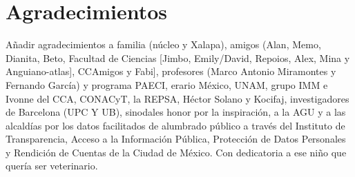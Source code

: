 \chapter{Agradecimientos}


Añadir agradecimientos a familia (núcleo y Xalapa), amigos (Alan, Memo, Dianita, Beto, Facultad de Ciencias [Jimbo, Emily/David, Repoios, Alex, Mina y Anguiano-atlas], CCAmigos y Fabi], profesores (Marco Antonio Miramontes y Fernando García) y programa PAECI, erario México, UNAM, grupo IMM e Ivonne del CCA, CONACyT, la REPSA, Héctor Solano y Kocifaj, investigadores de Barcelona (UPC Y UB), sinodales honor por la inspiración,  a la AGU y a las alcaldías por los datos facilitados de alumbrado público a través del Instituto de Transparencia, Acceso a la Información Pública, Protección de Datos Personales y Rendición de Cuentas de la Ciudad de México. Con dedicatoria a ese niño que quería ser veterinario.







